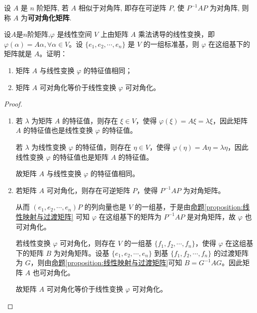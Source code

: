 \documentclass[lang=cn,newtx,10pt,scheme=chinese]{elegantbook}
\begin{document}
\begin{definition}[可对角化矩阵]
设 $A$ 是 $n$ 阶矩阵, 若 $A$ 相似于对角阵, 即存在可逆阵 $P$, 使 $P^{-1}AP$ 为对角阵, 则称 $A$ 为\textbf{可对角化矩阵}.
\end{definition}

\begin{lemma}\label{lemma:线性变换与矩阵的可对角化等价,特征值相同}
设$A$是$n$阶矩阵,$\varphi$ 是线性空间 $V$ 上由矩阵 $A$ 乘法诱导的线性变换，即 $\varphi(\alpha) = A\alpha, \forall \alpha \in V$。设 $\{e_1, e_2, \cdots, e_n\}$ 是 $V$ 的一组标准基，则 $\varphi$ 在这组基下的矩阵就是 $A$。证明：
\begin{enumerate}[(1)]
\item 矩阵 $A$ 与线性变换 $\varphi$ 的特征值相同；

\item 矩阵 $A$ 可对角化等价于线性变换 $\varphi$ 可对角化。
\end{enumerate}
\end{lemma}
\begin{proof}
\begin{enumerate}[(1)]
\item 若 $\lambda$ 为矩阵 $A$ 的特征值，则存在 $\xi \in V$，使得 $\varphi(\xi) = A\xi = \lambda \xi$，因此矩阵 $A$ 的特征值也是线性变换 $\varphi$ 的特征值。

若 $\lambda$ 为线性变换 $\varphi$ 的特征值，则存在 $\eta \in V$，使得 $\varphi(\eta) = A\eta = \lambda \eta$，因此线性变换 $\varphi$ 的特征值也是矩阵 $A$ 的特征值。

故矩阵 $A$ 与线性变换 $\varphi$ 的特征值相同。

\item 若矩阵 $A$ 可对角化，则存在可逆矩阵 $P$，使得 $P^{-1}AP$ 为对角矩阵。

从而 $(e_1, e_2, \cdots, e_n)P$ 的列向量也是 $V$ 的一组基，于是由\hyperref[proposition:线性映射与过渡矩阵]{命题\ref{proposition:线性映射与过渡矩阵}} 可知 $\varphi$ 在这组基下的矩阵为 $P^{-1}AP$ 是对角矩阵，故 $\varphi$ 也可对角化。

若线性变换 $\varphi$ 可对角化，则存在 $V$ 的一组基 $\{f_1, f_2, \cdots, f_n\}$，使得 $\varphi$ 在这组基下的矩阵 $B$ 为对角矩阵。设基 $\{e_1, e_2, \cdots, e_n\}$ 到基 $\{f_1, f_2, \cdots, f_n\}$ 的过渡矩阵为 $G$，则由\hyperref[proposition:线性映射与过渡矩阵]{命题\ref{proposition:线性映射与过渡矩阵}}可知 $B = G^{-1}AG$。因此矩阵 $A$ 也可对角化。

故矩阵 $A$ 可对角化等价于线性变换 $\varphi$ 可对角化。
\end{enumerate}
\end{proof}
\end{document}
